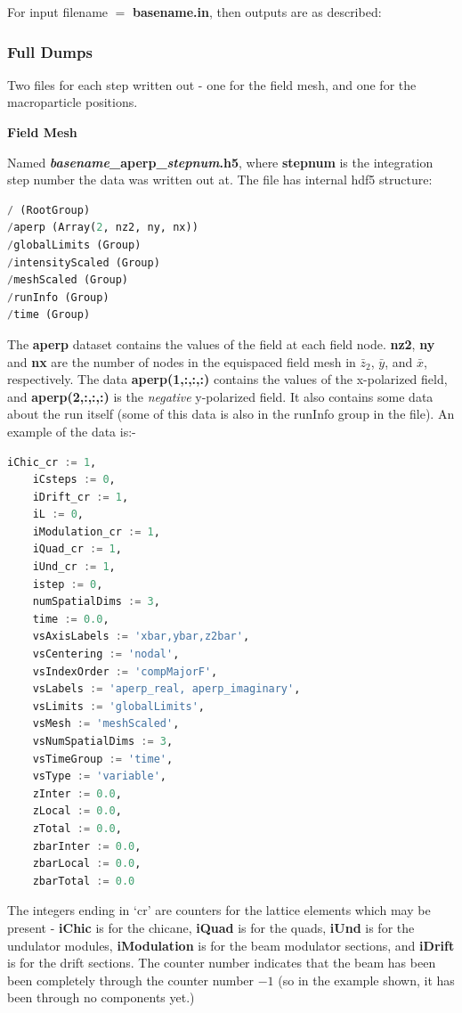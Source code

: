\documentclass[12pt]{article}%
\begin{document}
For input filename $=$ {\bf basename.in}, then outputs are as described:

\subsubsection{Full Dumps}

Two files for each step written out - one for the field mesh, and one for the macroparticle positions.

{\bf Field Mesh}

Named {\bf \textit{basename}\_aperp\_\textit{stepnum}.h5}, where {\bf stepnum} is the integration step number the data was written out at. The file has internal hdf5 structure:

\begin{lstlisting}[language=python, caption=Structure of HDF5 field output file produced by Puffin]
/ (RootGroup)
/aperp (Array(2, nz2, ny, nx))
/globalLimits (Group)
/intensityScaled (Group)
/meshScaled (Group)
/runInfo (Group)
/time (Group)
\end{lstlisting}

The {\bf aperp} dataset contains the values of the field at each field node. {\bf nz2}, {\bf ny} and {\bf nx} are the number of nodes in the equispaced field mesh in $\bar{z}_2$, $\bar{y}$, and $\bar{x}$, respectively. The data {\bf aperp(1,:,:,:)} contains the values of the x-polarized field, and {\bf aperp(2,:,:,:)} is the \textit{negative} y-polarized field.  It also contains some data about the run itself (some of this data is also in the runInfo group in the file). An example of the data is:-

\begin{lstlisting}[language=python]
    iChic_cr := 1,
    iCsteps := 0,
    iDrift_cr := 1,
    iL := 0,
    iModulation_cr := 1,
    iQuad_cr := 1,
    iUnd_cr := 1,
    istep := 0,
    numSpatialDims := 3,
    time := 0.0,
    vsAxisLabels := 'xbar,ybar,z2bar',
    vsCentering := 'nodal',
    vsIndexOrder := 'compMajorF',
    vsLabels := 'aperp_real, aperp_imaginary',
    vsLimits := 'globalLimits',
    vsMesh := 'meshScaled',
    vsNumSpatialDims := 3,
    vsTimeGroup := 'time',
    vsType := 'variable',
    zInter := 0.0,
    zLocal := 0.0,
    zTotal := 0.0,
    zbarInter := 0.0,
    zbarLocal := 0.0,
    zbarTotal := 0.0
\end{lstlisting}

The integers ending in `cr' are counters for the lattice elements which may be present - {\bf iChic} is for the chicane, {\bf iQuad} is for the quads, {\bf iUnd} is for the undulator modules, {\bf iModulation} is for the beam modulator sections, and {\bf iDrift} is for the drift sections. The counter number indicates that the beam has been been completely through the counter number $-1$ (so in the example shown, it has been through no components yet.)
\end{document}
